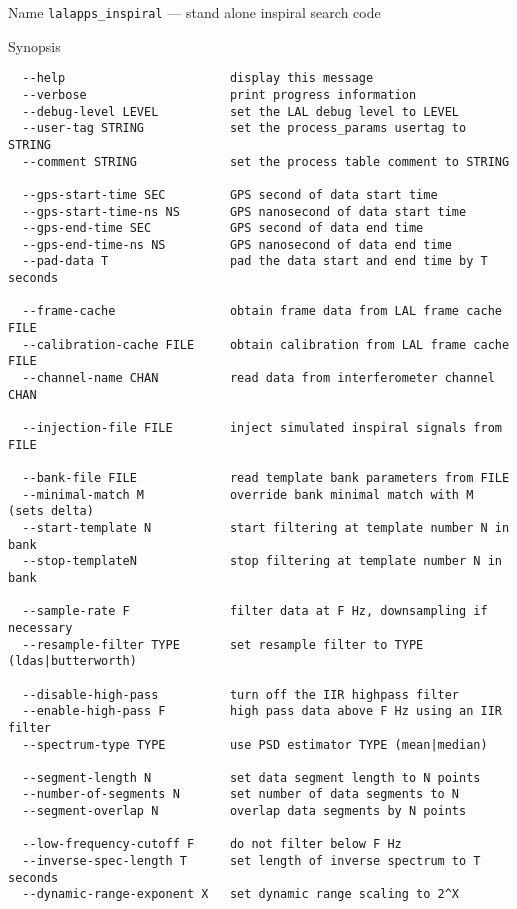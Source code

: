 \begin{entry}
\item[Name]
\verb$lalapps_inspiral$ --- stand alone inspiral search code

\item[Synopsis]
\begin{verbatim}
  --help                       display this message
  --verbose                    print progress information
  --debug-level LEVEL          set the LAL debug level to LEVEL
  --user-tag STRING            set the process_params usertag to STRING
  --comment STRING             set the process table comment to STRING

  --gps-start-time SEC         GPS second of data start time
  --gps-start-time-ns NS       GPS nanosecond of data start time
  --gps-end-time SEC           GPS second of data end time
  --gps-end-time-ns NS         GPS nanosecond of data end time
  --pad-data T                 pad the data start and end time by T seconds

  --frame-cache                obtain frame data from LAL frame cache FILE
  --calibration-cache FILE     obtain calibration from LAL frame cache FILE
  --channel-name CHAN          read data from interferometer channel CHAN

  --injection-file FILE        inject simulated inspiral signals from FILE

  --bank-file FILE             read template bank parameters from FILE
  --minimal-match M            override bank minimal match with M (sets delta)
  --start-template N           start filtering at template number N in bank
  --stop-templateN             stop filtering at template number N in bank

  --sample-rate F              filter data at F Hz, downsampling if necessary
  --resample-filter TYPE       set resample filter to TYPE (ldas|butterworth)

  --disable-high-pass          turn off the IIR highpass filter
  --enable-high-pass F         high pass data above F Hz using an IIR filter
  --spectrum-type TYPE         use PSD estimator TYPE (mean|median)

  --segment-length N           set data segment length to N points
  --number-of-segments N       set number of data segments to N
  --segment-overlap N          overlap data segments by N points

  --low-frequency-cutoff F     do not filter below F Hz
  --inverse-spec-length T      set length of inverse spectrum to T seconds
  --dynamic-range-exponent X   set dynamic range scaling to 2^X


\end{verbatim}
\end{entry}
